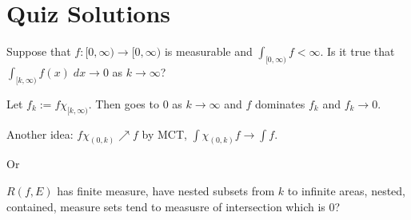 \newpage
\section{Quiz Solutions}


























\begin{quizsol}
Suppose that $f: [0,\infty) \to [0,\infty)$ is measurable and $\int_{[0,\infty)} f < \infty$. Is it true that $\int_{[k,\infty)} f(x) \; dx \to 0$ as $k \to \infty$? 
\end{quizsol}

\pf Let $f_k:= f \chi_{[k,\infty)}$. Then goes to $0$ as $k \to \infty$ and $f$ dominates $f_k$ and $f_k \to 0$. 


Another idea: $f \chi_{(0,k)} \nearrow f$ by MCT, $\int \chi_{(0,k)} f \to \int f$. 


Or 

$R(f,E)$ has finite measure, have nested subsets from $k$ to infinite areas, nested, contained, measure sets tend to measusre of intersection which is 0? 































